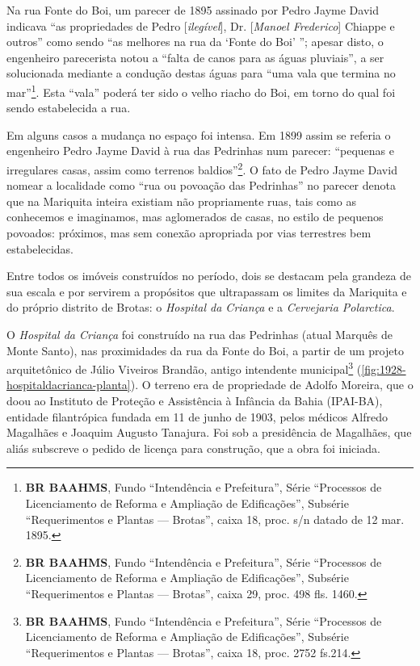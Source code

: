 Na rua Fonte do Boi, um parecer de 1895 assinado por Pedro Jayme David indicava ``as propriedades de Pedro [\textit{ilegível}], Dr. [\textit{Manoel Frederico}] Chiappe e outros'' como sendo ``as melhores na rua da `Fonte do Boi' ''; apesar disto, o engenheiro parecerista notou a ``falta de canos para as águas pluviais'', a ser solucionada mediante a condução destas águas para ``uma vala que termina no mar''\footnote{\textbf{BR BAAHMS}, Fundo ``Intendência e Prefeitura'', Série ``Processos de Licenciamento de Reforma e Ampliação de Edificações'', Subsérie ``Requerimentos e Plantas --- Brotas'', caixa 18, proc. s/n datado de 12 mar. 1895.}. Esta ``vala'' poderá ter sido o velho riacho do Boi, em torno do qual foi sendo estabelecida a rua.

Em alguns casos a mudança no espaço foi intensa. Em 1899 assim se referia o engenheiro Pedro Jayme David à rua das Pedrinhas num parecer: ``pequenas e irregulares casas, assim como terrenos baldios''\footnote{\textbf{BR BAAHMS}, Fundo ``Intendência e Prefeitura'', Série ``Processos de Licenciamento de Reforma e Ampliação de Edificações'', Subsérie ``Requerimentos e Plantas --- Brotas'', caixa 29, proc. 498 fls. 1460.}. O fato de Pedro Jayme David nomear a localidade como ``rua ou povoação das Pedrinhas'' no parecer denota que na Mariquita inteira existiam não propriamente ruas, tais como as conhecemos e imaginamos, mas aglomerados de casas, no estilo de pequenos povoados: próximos, mas sem conexão apropriada por vias terrestres bem estabelecidas.

Entre todos os imóveis construídos no período, dois se destacam pela grandeza de sua escala e por servirem a propósitos que ultrapassam os limites da Mariquita e do próprio distrito de Brotas: o \textit{Hospital da Criança} e a \textit{Cervejaria Polarctica}.

O \textit{Hospital da Criança} foi construído na rua das Pedrinhas (atual Marquês de Monte Santo), nas proximidades da rua da Fonte do Boi, a partir de um projeto arquitetônico de Júlio Viveiros Brandão, antigo intendente municipal\footnote{\textbf{BR BAAHMS}, Fundo ``Intendência e Prefeitura'', Série ``Processos de Licenciamento de Reforma e Ampliação de Edificações'', Subsérie ``Requerimentos e Plantas --- Brotas'', caixa 18, proc. 2752 fs.214.} (\autoref{fig:1928-hospitaldacrianca-planta}). O terreno era de propriedade de Adolfo Moreira, que o doou ao Instituto de Proteção e Assistência à Infância da Bahia (IPAI-BA), entidade filantrópica fundada em 11 de junho de 1903, pelos médicos Alfredo Magalhães e Joaquim Augusto Tanajura. Foi sob a presidência de Magalhães, que aliás subscreve o pedido de licença para construção, que a obra foi iniciada. 


